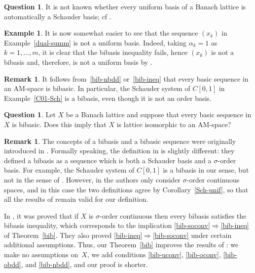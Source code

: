 \documentclass[12pt]{amsart}
\theoremstyle{plain}
\theoremstyle{definition}
\newtheorem{remark}[theorem]{Remark}
\newtheorem{question}[theorem]{Question}
\newtheorem{example}[theorem]{Example}
\begin{document}
\begin{question}
  It is not known whether every uniform basis of a Banach lattice is
  automatically a Schauder basis; cf \cite[Problem 1.3]{Gumenchuk:15}.
\end{question}

\begin{example}\label{nonbib-l1}
  It is now somewhat easier to see that the sequence $(x_k)$ in
  Example~\ref{dual-summ} is not  a uniform
  basis. Indeed, taking $\alpha_k=1$ as $k=1,\dots,m$, it is clear
  that the bibasis inequality fails, hence $(x_k)$ is not a bibasis
  and, therefore, is not a uniform basis by
  .
\end{example}

\begin{remark}\label{AM-basic-bib}
  It follows from~\eqref{bib-nbdd} or~\eqref{bib-ineq} that every
  basic sequence in an AM-space is bibasic. In particular, the
  Schauder system of $C[0,1]$ in Example~\ref{C01-Sch} is a bibasis,
  even though it is not an order basis.
\end{remark}

\begin{question}
  Let $X$ be a Banach lattice and suppose that every basic sequence in
  $X$ is bibasic. Does this imply that $X$ is lattice isomorphic to an
  AM-space?
\end{question}

\begin{remark}
  The concepts of a bibasis and a bibasic sequence were originally
  introduced in \cite{Gumenchuk:15}. Formally speaking, the definition
  in \cite{Gumenchuk:15} is slightly different: they defined a bibasis
  as a sequence which is both a Schauder basis and a $\sigma$-order
  basis. For example, the Schauder system of $C[0,1]$ is a bibasis in
  our sense, but not in the sense of \cite{Gumenchuk:15}. However, in
  \cite{Gumenchuk:15} the authors only consider $\sigma$-order
  continuous spaces, and in this case the two definitions agree by
  Corollary~\ref{Sch-unif}, so that all the results of
  \cite{Gumenchuk:15} remain valid for our definition.

  In \cite{Gumenchuk:15}, it was proved that if $X$ is $\sigma$-order
  continuous then every bibasis satisfies the bibasis inequality,
  which corresponds to the implication
  \eqref{bib-soconv}$\Rightarrow$\eqref{bib-ineq} of
  Theorem~\ref{bib}. They also proved
  \eqref{bib-ineq}$\Rightarrow$\eqref{bib-soconv} under certain
  additional assumptions. Thus, our Theorem~\ref{bib} improves the
  results of \cite{Gumenchuk:15}: we make no assumptions on~$X$, we
  add conditions \eqref{bib-uconv}, \eqref{bib-oconv},
  \eqref{bib-obdd}, and \eqref{bib-nbdd}, and our proof is shorter.
\end{remark}
\end{document}
